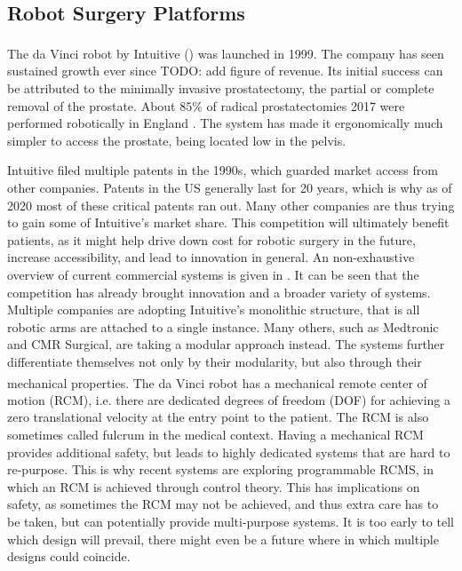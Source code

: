 \subsection{Robot Surgery Platforms}
\label{in:sec:robot_surgery_platforms}
The da Vinci\textsuperscript{\textregistered} robot by Intuitive () was launched in 1999. The company has seen sustained growth ever since TODO: add figure of revenue. Its initial success can be attributed to the minimally invasive prostatectomy, the partial or complete removal of the prostate. About $85\%$ of radical prostatectomies 2017 were performed robotically in England \cite{maynou2021patterns}. The system has made it ergonomically much simpler to access the prostate, being located low in the pelvis.

Intuitive filed multiple patents in the 1990s, which guarded market access from other companies. Patents in the US generally last for 20 years, which is why as of 2020 most of these critical patents ran out. Many other companies are thus trying to gain some of Intuitive's market share. This competition will ultimately benefit patients, as it might help drive down cost for robotic surgery in the future, increase accessibility, and lead to innovation in general. An non-exhaustive overview of current commercial systems is given in . It can be seen that the competition has already brought innovation and a broader variety of systems. Multiple companies are adopting Intuitive's monolithic structure, that is all robotic arms are attached to a single instance. Many others, such as Medtronic and CMR Surgical, are taking a modular approach instead. The systems further differentiate themselves not only by their modularity, but also through their mechanical properties. The da Vinci\textsuperscript{\textregistered} robot has a mechanical remote center of motion (RCM), i.e. there are dedicated degrees of freedom (DOF) for achieving a zero translational velocity at the entry point to the patient. The RCM is also sometimes called fulcrum in the medical context. Having a mechanical RCM provides additional safety, but leads to highly dedicated systems that are hard to re-purpose. This is why recent systems are exploring programmable RCMS, in which an RCM is achieved through control theory. This has implications on safety, as sometimes the RCM may not be achieved, and thus extra care has to be taken, but can potentially provide multi-purpose systems. It is too early to tell which design will prevail, there might even be a future where in which multiple designs could coincide. 

